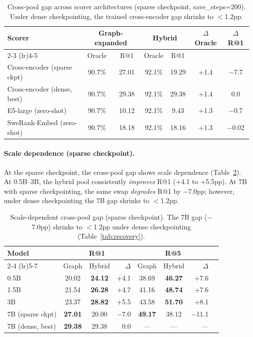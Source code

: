 \documentclass{article}
\begin{document}
\begin{table}[h]
\centering
\caption{Cross-pool gap across scorer architectures (sparse checkpoint, save\_steps=200). Under dense checkpointing, the trained cross-encoder gap shrinks to $<$1.2pp.}
\label{tab:fallacy_arch}
\small
\begin{tabular}{lcccccc}
\toprule
\textbf{Scorer} & \multicolumn{2}{c}{\textbf{Graph-expanded}} & \multicolumn{2}{c}{\textbf{Hybrid}} & \textbf{$\Delta$Oracle} & \textbf{$\Delta$R@1} \\
\cmidrule(lr){2-3} \cmidrule(lr){4-5}
 & Oracle & R@1 & Oracle & R@1 & & \\
\midrule
Cross-encoder (sparse ckpt) & 90.7\% & 27.01 & 92.1\% & 19.29 & +1.4 & $-$7.7 \\
Cross-encoder (dense, best) & 90.7\% & 29.38 & 92.1\% & 29.38 & +1.4 & 0.0 \\
E5-large (zero-shot) & 90.7\% & 10.12 & 92.1\% & 9.43 & +1.3 & $-$0.7 \\
SweRank-Embed (zero-shot) & 90.7\% & 18.18 & 92.1\% & 18.16 & +1.3 & $-$0.02 \\
\bottomrule
\end{tabular}
\end{table}

\paragraph{Scale dependence (sparse checkpoint).}
At the sparse checkpoint, the cross-pool gap shows scale dependence (Table~\ref{tab:scale_fallacy}).
At 0.5B--3B, the hybrid pool consistently \emph{improves} R@1 ($+$4.1 to $+$5.5pp).
At 7B with sparse checkpointing, the same swap \emph{degrades} R@1 by $-$7.0pp; however, under dense checkpointing the 7B gap shrinks to $<$1.2pp.

\begin{table}[h]
\centering
\caption{Scale-dependent cross-pool gap (sparse checkpoint). The 7B gap ($-$7.0pp) shrinks to $<$1.2pp under dense checkpointing (Table~\ref{tab:recovery}).}
\label{tab:scale_fallacy}
\small
\begin{tabular}{lccrccrr}
\toprule
\textbf{Model} & \multicolumn{3}{c}{\textbf{R@1}} & \multicolumn{3}{c}{\textbf{R@5}} \\
\cmidrule(lr){2-4} \cmidrule(lr){5-7}
 & Graph & Hybrid & $\Delta$ & Graph & Hybrid & $\Delta$ \\
\midrule
0.5B  & 20.02 & \textbf{24.12} & $+$4.1 & 38.69 & \textbf{46.27} & $+$7.6 \\
1.5B  & 21.54 & \textbf{26.28} & $+$4.7 & 41.16 & \textbf{48.74} & $+$7.6 \\
3B    & 23.37 & \textbf{28.82} & $+$5.5 & 43.58 & \textbf{51.70} & $+$8.1 \\
7B (sparse ckpt) & \textbf{27.01} & 20.00 & $-$7.0 & \textbf{49.17} & 38.12 & $-$11.1 \\
7B (dense, best) & \textbf{29.38} & 29.38 & 0.0 & --- & --- & --- \\
\bottomrule
\end{tabular}
\end{table}
\end{document}
